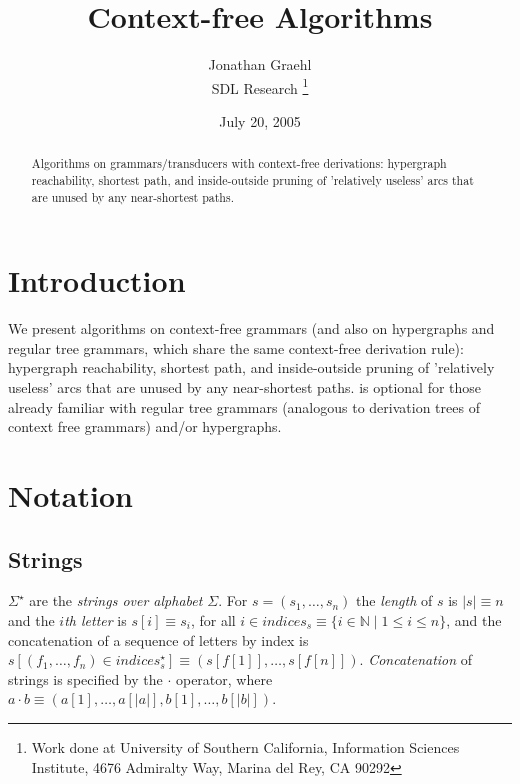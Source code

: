 \documentclass[english]{article}
\title{Context-free Algorithms}   %
\author{Jonathan Graehl \\ SDL Research \thanks{Work done at University of Southern California, Information Sciences Institute, 4676 Admiralty Way, Marina del Rey, CA 90292}
}
\date{July 20, 2005}    %
\newcommand\secref[1]{\ifthenelse{\equal{#1}{}}{}{Section~\ref{s:#1}}}
\newcommand\comment[1]{}
\newcommand\concat{\cdot}
\newcommand\naturals{\mathbb{N}}
\newcommand\seqn[2]{({#1}_{1},\ldots,{#1}_{#2})}
\newcommand\st{\;|\;}
\newcommand{\kstar}{^{\star}}
\begin{document}
\maketitle

\begin{abstract}
  Algorithms on grammars/transducers with context-free derivations: hypergraph reachability, shortest path, and inside-outside pruning of 'relatively useless' arcs that are unused by any near-shortest paths.

\end{abstract}

\section{Introduction}
We present algorithms on context-free grammars (and also on hypergraphs and regular tree grammars, which share the same context-free derivation rule): hypergraph reachability, shortest path, and inside-outside pruning of 'relatively useless' arcs that are unused by any near-shortest paths. \secref{notation} is optional for those already familiar with regular tree grammars (analogous to derivation trees of context free grammars) and/or hypergraphs.

\section{Notation}
\label{s:notation}
\label{sec1}
\subsection{Strings}

$\Sigma\kstar$ are the \emph{strings over alphabet $\Sigma$}.  For
$s=(s_{1},\ldots,s_{n})$ the \emph{length} of $s$ is $|s|\equiv n$ and the
$i$\emph{th letter} is $s[i]\equiv s_{i}$, for all $i\in indices_{s}\equiv\{
i\in\naturals \st 1\leq i\leq n\}$, and the concatenation of a sequence of
letters by index is $s[\seqn{f}{n}\in indices_{s}\kstar]\equiv
(s[f[1]],\ldots,s[f[n]])$.  \emph{Concatenation} of strings is specified by
the $\concat$ operator, where $a\concat b\equiv(a[1],\ldots,a[|a|],b[1],\ldots,b[|b|])$.
\comment{Naturally, $|a\concat b|=|a|+|b|$.}
\comment{:
\[
\seqn{a}{n}\concat\seqn{b}{m}\equiv(a_{1},\ldots,a_{n},b_{1},\ldots,b_{m})\]
}
\end{document}
